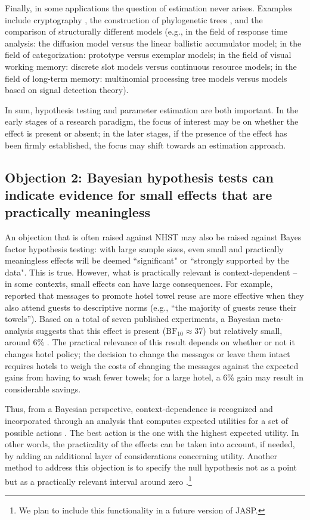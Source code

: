 Finally, in some applications the question of estimation never arises. Examples include cryptography \cite{Turing19412012,Zabell2012}, the construction of phylogenetic trees \cite{HuelsenbeckRonquist2001}, and the comparison of structurally different models (e.g., in the field of response time analysis: the diffusion model versus the linear ballistic accumulator model; in the field of categorization: prototype versus exemplar models; in the field of visual working memory: discrete slot models versus continuous resource models; in the field of long-term memory: multinomial processing tree models versus models based on signal detection theory).

In sum, hypothesis testing and parameter estimation are both important. In the early stages of a research paradigm, the focus of interest may be on whether the effect is present or absent; in the later stages, if the presence of the effect has been firmly established, the focus may shift towards an estimation approach.

\subsection{Objection 2: Bayesian hypothesis tests can indicate evidence for small effects that are practically meaningless}
An objection that is often raised against NHST may also be raised against Bayes factor hypothesis testing: with large sample sizes, even small and practically meaningless effects will be deemed ``significant" or ``strongly supported by the data". This is true. However, what is practically relevant is context-dependent -- in some contexts, small effects can have large consequences. For example,  reported that messages to promote hotel towel reuse are more effective when they also attend guests to descriptive norms (e.g., ``the majority of guests reuse their towels''). Based on a total of seven published experiments, a Bayesian meta-analysis suggests that this effect is present ($\text{BF}_{10} \approx 37$) but relatively small, around 6\% \cite{ScheibehenneEtAlinpress}. The practical relevance of this result depends on whether or not it changes hotel policy; the decision to change the messages or leave them intact requires hotels to weigh the costs of changing the messages against the expected gains from having to wash fewer towels; for a large hotel, a 6\% gain may result in considerable savings.

Thus, from a Bayesian perspective, context-dependence is recognized and incorporated through an analysis that computes expected utilities for a set of possible actions \cite{Lindley1985}. The best action is the one with the highest expected utility. In other words, the practicality of the effects can be taken into account, if needed, by adding an additional layer of considerations concerning utility. Another method to address this objection is to specify the null hypothesis not as a point but as a practically relevant interval around zero \cite{MoreyRouder2011}.\footnote{We plan to include this functionality in a future version of JASP.}

